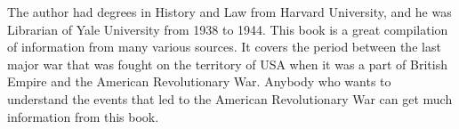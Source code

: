 The author had degrees in History and Law from Harvard University, and he was
Librarian of Yale University from 1938 to 1944. This book is a great
compilation of information from many various sources. It covers the period
between the last major war that was fought on the territory of USA when it was
a part of British Empire and the American Revolutionary War.  Anybody who wants
to understand the events that led to the American Revolutionary War can get
much information from this book.
